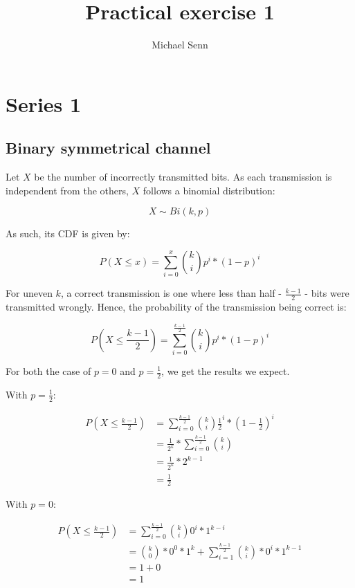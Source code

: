 \documentclass[a4paper]{scrreprt}
\title{Practical exercise 1}
\author{Michael Senn \maillink{michael.senn@students.unibe.ch}}
\date{\printdate}
\begin{document}
\maketitle

\chapter{Series 1}

\section{Binary symmetrical channel}

Let $X$ be the number of incorrectly transmitted bits. As each transmission is
independent from the others, $X$ follows a binomial distribution:

\[
	X \sim Bi(k, p)
\]

As such, its CDF is given by:

\[
	P(X \leq x) = \sum_{i=0}^{x}{\binom{k}{i} p^i * (1-p)^i}
\]

For uneven $k$, a correct transmission is one where less than half -
$\frac{k-1}{2}$ - bits were transmitted wrongly. Hence, the probability of the
transmission being correct is:

\[
	P(X \leq \frac{k-1}{2}) = \sum_{i=0}^{\frac{k-1}{2}}{\binom{k}{i} p^i * (1-p)^i}
\]

For both the case of $p = 0$ and $p = \frac{1}{2}$, we get the results we expect.

With $p = \frac{1}{2}$:

\begin{align*}
	P(X \leq \frac{k-1}{2}) & = \sum_{i=0}^{\frac{k-1}{2}}{\binom{k}{i} \frac{1}{2}^i * (1-\frac{1}{2})^i} \\
				& = \frac{1}{2^k} * \sum_{i=0}^{\frac{k-1}{2}}{\binom{k}{i}} \\
				& = \frac{1}{2^k} * 2^{k-1} \\
				& = \frac{1}{2}
\end{align*}

With $p = 0$:

\begin{align*}
	P(X \leq \frac{k-1}{2}) & = \sum_{i=0}^{\frac{k-1}{2}}{\binom{k}{i} 0^i * 1^{k-i}} \\
			        & = \binom{k}{0} * 0^0 * 1^k + \sum_{i=1}^{\frac{k-1}{2}}{\binom{k}{i} * 0^i * 1^{k-1}} \\
		                & = 1 + 0 \\
	                        & = 1
\end{align*}
\end{document}
